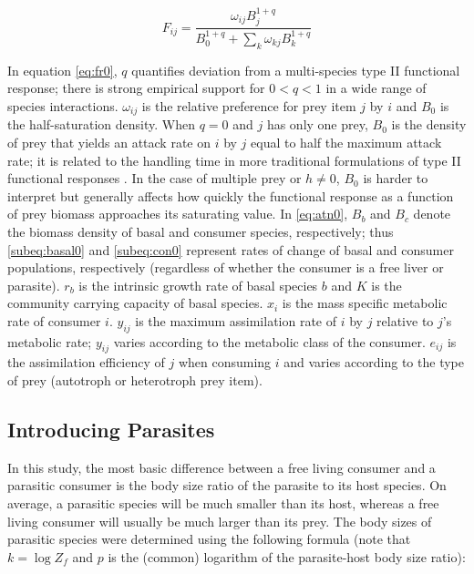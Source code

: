 \documentclass[/home/nkappler/Research/Dissertation/dissertation.tex]{subfiles}
\begin{document}
\begin{bibunit}
\begin{equation}
    F_{ij} = \frac{\omega_{ij}B_j^{1+q}}{B_0^{1+q} + \sum_k\omega_{kj}B_k^{1+q}}\label{eq:fr0}
\end{equation}

In equation \ref{eq:fr0}, $q$ quantifies deviation from a multi-species type II
functional response; there is strong empirical support for $0<q<1$ in a wide
range of species interactions. $\omega_{ij}$ is the relative preference for
prey item $j$ by $i$ and $B_0$ is the half-saturation density. When $q=0$ and
$j$ has only one prey, $B_0$ is the density of prey that yields an attack rate
on $i$ by $j$ equal to half the maximum attack rate; it is related to the
handling time in more traditional formulations of type II functional responses
\cite*{Holling1959}. In the case of multiple prey or $h\neq0$, $B_0$ is harder to
interpret but generally affects how quickly the functional response as a
function of prey biomass approaches its saturating value. In \eqref{eq:atn0},
$B_b$ and $B_c$ denote the biomass density of basal and consumer species,
respectively; thus \eqref{subeq:basal0} and \eqref{subeq:con0} represent rates
of change of basal and consumer populations, respectively (regardless of
whether the consumer is a free liver or parasite).  $r_b$ is the intrinsic
growth rate of basal species $b$ and $K$ is the community carrying capacity of
basal species. $x_i$ is the mass specific metabolic rate of consumer $i$.
$y_{ij}$ is the maximum assimilation rate of $i$ by $j$ relative to $j$'s
metabolic rate; $y_{ij}$ varies according to the metabolic class of the
consumer. $e_{ij}$ is the assimilation efficiency of $j$ when consuming $i$ and
varies according to the type of prey (autotroph or heterotroph prey item).  



\subsection{Introducing Parasites\label{subsec:paraIntro}}
 
 In this study, the most basic difference between a free living consumer and a
 parasitic consumer is the body size ratio of the parasite to its host species.
 On average, a parasitic species will be much smaller than its host, whereas a
 free living consumer will usually be much larger than its prey. The body sizes
 of parasitic species were determined using the following formula (note that $k
 = \log Z_{\!f}$ and $p$ is the (common) logarithm of the parasite-host body size
 ratio):


\end{bibunit}
\end{document}
